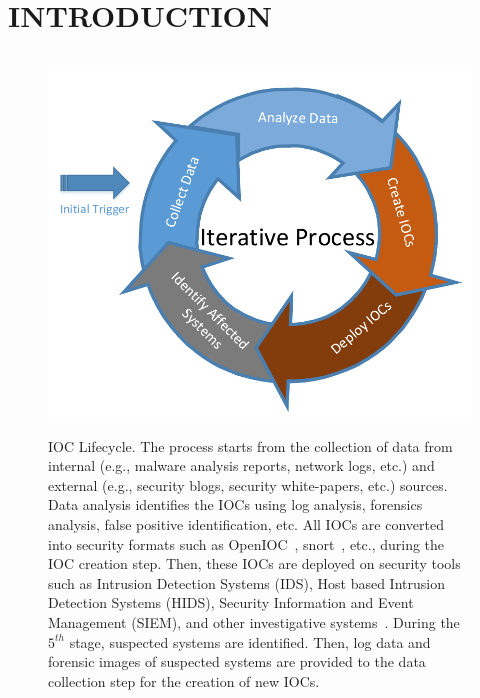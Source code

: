 \chapter{INTRODUCTION}
\label{chap:introduction}

\begin{figure} [tb]
  \includegraphics[width=14cm, height=10cm]{lifecycle.pdf}
  \caption [] {IOC Lifecycle. The process starts from the collection of data from internal (e.g., malware analysis reports, network logs, etc.) and external (e.g., security blogs, security white-papers, etc.) sources. Data analysis identifies the IOCs using log analysis, forensics analysis, false positive identification, etc. All IOCs are converted into security formats such as OpenIOC~\cite{openioc}, snort~\cite{snort}, etc., during the IOC creation step. Then, these IOCs are deployed on security tools such as Intrusion Detection Systems (IDS), Host based Intrusion Detection Systems (HIDS), Security Information and Event Management (SIEM), and other investigative systems~\cite{lunt}. During the $5^{th}$ stage, suspected systems are identified. Then, log data and forensic images of suspected systems are provided to the data collection step for the creation of new IOCs. }
  \label{fig:ioc}
\end{figure}

